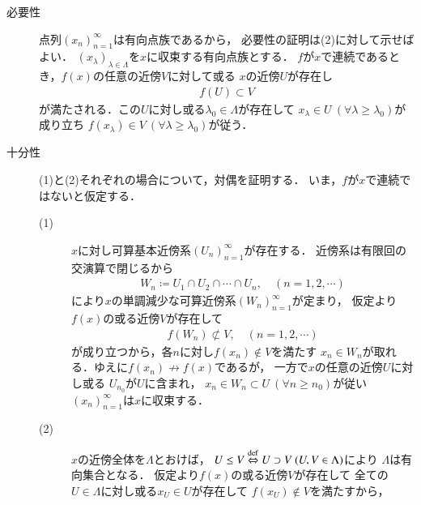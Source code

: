 	\begin{prf}\mbox{}
		\begin{description}
			\item[必要性]
				点列$(x_n)_{n=1}^{\infty}$は有向点族であるから，
				必要性の証明は(2)に対して示せばよい．
				$(x_\lambda)_{\lambda \in \Lambda}$を$x$に収束する有向点族とする．
				$f$が$x$で連続であるとき，$f(x)$の任意の近傍$V$に対して或る
				$x$の近傍$U$が存在し
				\begin{align}
					f(U) \subset V
				\end{align}
				が満たされる．この$U$に対し或る$\lambda_0 \in \Lambda$が存在して
				$x_\lambda \in U\ (\forall \lambda \geq \lambda_0)$が成り立ち
				$f(x_\lambda) \in V\ (\forall \lambda \geq \lambda_0)$が従う．
				
			\item[十分性] (1)と(2)それぞれの場合について，対偶を証明する．
				いま，$f$が$x$で連続ではないと仮定する．
				\begin{description}
					\item[(1)]
						$x$に対し可算基本近傍系$(U_n)_{n=1}^{\infty}$が存在する．
						近傍系は有限回の交演算で閉じるから
						\begin{align}
							W_n \coloneqq U_1 \cap U_2 \cap \cdots \cap U_n,
							\quad (n=1,2,\cdots)
						\end{align}
						により$x$の単調減少な可算近傍系$(W_n)_{n=1}^{\infty}$が定まり，
						仮定より$f(x)$の或る近傍$V$が存在して
						\begin{align}
							f(W_n) \not\subset V,
							\quad (n=1,2,\cdots)
						\end{align}
						が成り立つから，各$n$に対し$f(x_n) \notin V$を満たす
						$x_n \in W_n$が取れる．ゆえに$f(x_n) \not\rightarrow f(x)$であるが，
						一方で$x$の任意の近傍$U$に対し或る
						$U_{n_0}$が$U$に含まれ，
						$x_n \in W_n \subset U\ (\forall n \geq n_0)$が従い
						$(x_n)_{n=1}^{\infty}$は$x$に収束する．
					\item[(2)]
						$x$の近傍全体を$\Lambda$とおけば，
						$U \leq V \overset{\mathrm{def}}{\Leftrightarrow} U \supset V\ (U,V \in \Lambda)$により
						$\Lambda$は有向集合となる．
						仮定より$f(x)$の或る近傍$V$が存在して
						全ての$U \in \Lambda$に対し或る$x_U \in U$が存在して
						$f(x_U) \notin V$を満たすから，
						
				\end{description}
		\end{description}
	\end{prf}
	